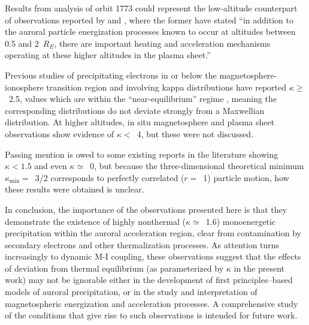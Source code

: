   Results from analysis of orbit 1773 could represent the low-altitude
  counterpart of observations reported by \citet{Wygant2002} and
  \citet{Schriver2003}, where the former have stated ``in addition to the
  auroral particle energization processes known to occur at altitudes between
  0.5 and 2~$R_E$, there are important heating and acceleration mechanisms
  operating at these higher altitudes in the plasma sheet.''

  Previous studies of precipitating electrons in or below the
  magnetosphere-ionosphere transition region and involving kappa distributions
  \citep{Olsson1998,Ogasawara2006,Kaeppler2014a} have reported $\kappa
  \geq$~2.5, values which are within the ``near-equilibrium'' regime
  \citep{Livadiotis2010}, meaning the corresponding distributions do not deviate
  strongly from a Maxwellian distribution. At higher altitudes, in situ
  magnetosphere and plasma sheet observations
  \citet{Christon1989,Christon1991,Kletzing2003} show evidence of $\kappa <$~4,
  but these were not discussed.

  Passing mention is owed to some existing reports in the literature showing
  $\kappa < 1.5$ and even $\kappa \simeq$~0, but because the three-dimensional
  theoretical minimum $\kappa_{\mathrm{min}} =$~3/2 corresponds to perfectly
  correlated ($r =$~1) particle motion, how these results were obtained is
  unclear.

  In conclusion, the importance of the observations presented here is that they
  demonstrate the existence of highly nonthermal ($\kappa \simeq$~1.6)
  monoenergetic precipitation within the auroral acceleration region, clear from
  contamination by secondary electrons and other thermalization processes. As
  attention turns increasingly to dynamic M-I coupling, these observations
  suggest that the effects of deviation from thermal equilibrium (as
  parameterized by $\kappa$ in the present work) may not be ignorable either in
  the development of first principles--based models of auroral precipitation, or
  in the study and interpretation of magnetospheric energization and
  acceleration processes. A comprehensive study of the conditions that give rise
  to such observations is intended for future work.



